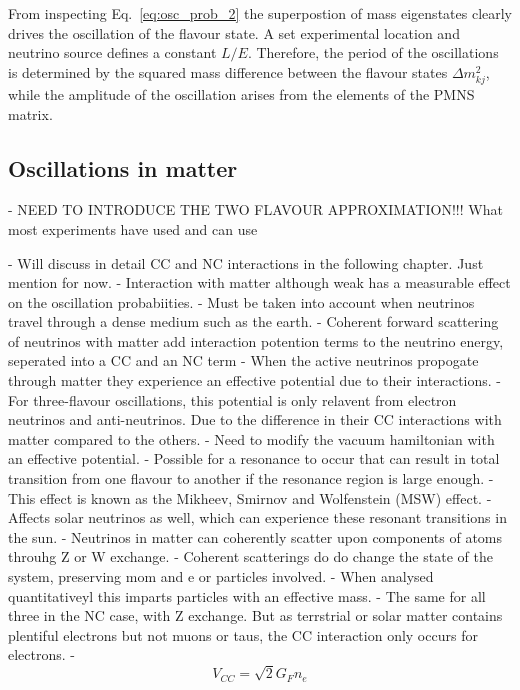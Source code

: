 From inspecting Eq.~\ref{eq:osc_prob_2} the superpostion of mass eigenstates clearly drives the
oscillation of the flavour state. A set experimental location and neutrino source defines a
constant $L/E$. Therefore, the period of the oscillations is determined by the squared mass
difference between the flavour states $\Delta m_{kj}^{2}$, while the amplitude of the
oscillation arises from the elements of the PMNS matrix.

\subsection{Oscillations in matter}

- NEED TO INTRODUCE THE TWO FLAVOUR APPROXIMATION!!! What most experiments have used and can use

- Will discuss in detail CC and NC interactions in the following chapter. Just mention for now.
- Interaction with matter although weak has a measurable effect on the oscillation probabiities.
- Must be taken into account when neutrinos travel through a dense medium such as the earth.
- Coherent forward scattering of neutrinos with matter add interaction potention terms to the
neutrino energy, seperated into a CC and an NC term
- When the active neutrinos propogate through matter they experience an effective potential
due to their interactions.
- For three-flavour oscillations, this potential is only relavent from electron neutrinos and
anti-neutrinos. Due to the difference in their CC interactions with matter compared to the others.
- Need to modify the vacuum hamiltonian with an effective potential.
- Possible for a resonance to occur that can result in total transition from one flavour to another
if the resonance region is large enough.
- This effect is known as the Mikheev, Smirnov and Wolfenstein (MSW) effect.
- Affects solar neutrinos as well, which can experience these resonant transitions in the sun.
- Neutrinos in matter can coherently scatter upon components of atoms throuhg Z or W exchange.
- Coherent scatterings do do change the state of the system, preserving mom and e or particles
involved.
- When analysed quantitativeyl this imparts particles with an effective mass.
- The same for all three in the NC case, with Z exchange. But as terrstrial or solar matter
contains plentiful electrons but not muons or taus, the CC interaction only occurs for electrons.
-
\begin{equation} %
    V_{CC} = \sqrt{2}G_{F}n_{e}
    \label{eq:effective_potential}
\end{equation} %
